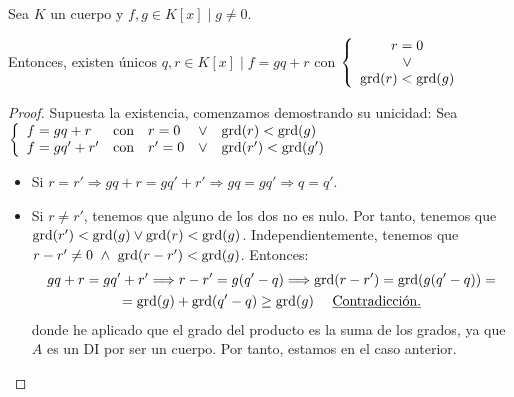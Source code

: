\begin{teo}
    \label{teo:DividirPolinomios}
    Sea $K$ un cuerpo y $f,g \in K[x] \mid g\neq 0$.
    
    Entonces, existen únicos $q,r \in K[x] \mid f=gq+r$ con $\left\{\begin{array}{c}
            r=0 \\ \lor \\ \operatorname{grd}(r)<\operatorname{grd}(g)
        \end{array}\right.$
\end{teo}
\begin{proof}
    Supuesta la existencia, comenzamos demostrando su unicidad:\newline
    Sea $\left\{\begin{array}{lllll}
        f=gq+r & \text{con} & r=0 & \lor & \operatorname{grd}(r)<\operatorname{grd}(g) \\
        f=gq'+r' & \text{con} & r'=0 & \lor & \operatorname{grd}(r')<\operatorname{grd}(g')
    \end{array}\right.$

    \begin{itemize}
        \item Si $r=r' \Longrightarrow gq+r = gq'+r' \Longrightarrow gq = gq' \Longrightarrow q=q'$.

        \item Si $r \neq r'$, tenemos que alguno de los dos no es nulo. Por tanto, tenemos que $\operatorname{grd}(r')<\operatorname{grd}(g) \lor \operatorname{grd}(r)<\operatorname{grd}(g)$. Independientemente, tenemos que $ r-r' \neq 0 \ \land \  \operatorname{grd}(r-r') < \operatorname{grd}(g)$. Entonces:
        \begin{multline*}
            gq+r = gq'+r' \Longrightarrow r-r' = g(q'-q) \Longrightarrow \operatorname{grd}(r-r') = \operatorname{grd}(g(q'-q)) =\\
            =\operatorname{grd}(g)+\operatorname{grd}(q'-q) \geq \operatorname{grd}(g) \quad \text{ \underline{Contradicción.}}
        \end{multline*}
        donde he aplicado que el grado del producto es la suma de los grados, ya que $A$ es un DI por ser un cuerpo. Por tanto, estamos en el caso anterior.
    \end{itemize}
    

\end{proof}
